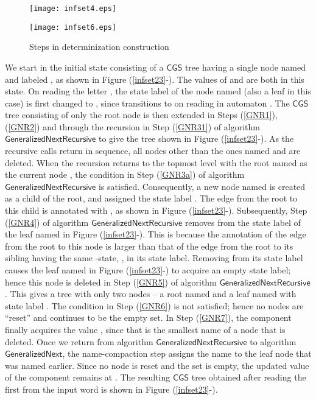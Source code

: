 \documentclass[3p]{elsarticle}
\newcommand{\CGS}{\ensuremath{\textsf{CGS }}}
\newcommand{\algo}[1]{\ensuremath{\textsf{{#1}}}}
\begin{document}
\begin{figure}[ht]
\begin{minipage}[t]{0.6\linewidth}
\vspace{0pt}
\begin{center}
\texttt{[image: infset4.eps]}
\end{center}
\label{infset4}
\end{minipage}
\begin{minipage}[t]{0.4\linewidth}
\vspace{0pt}
\begin{center}
\texttt{[image: infset6.eps]}
\end{center}
\end{minipage}
\caption{Steps in determinization construction}
\label{infset45}
\end{figure}

We start in the initial state consisting of a \CGS tree having a
single node named  and labeled , as shown in Figure
(\ref{infset23}-).  The values of  and  are both  in this state.  On reading the letter , the state label of the
node named  (also a leaf in this case) is first changed to
, since  transitions to  on reading  in
automaton .  The \CGS tree consisting of only the root node is
then extended in Steps (\ref{GNR1}), (\ref{GNR2}) and through the
recursion in Step (\ref{GNR31}) of algorithm
\algo{GeneralizedNextRecursive} to give the tree shown in Figure
(\ref{infset23}-).  As the recursive calls return in sequence,
all nodes other than the ones named  and  are deleted.  When the
recursion returns to the topmost level with the root named  as the
current node , the condition in Step (\ref{GNR3a}) of algorithm
\algo{GeneralizedNextRecursive} is satisfied.  Consequently, a new
node named  is created as a child of the root, and assigned the
state label .  The edge from the root to this child is
annotated with , as shown in Figure (\ref{infset23}-).
Subsequently, Step (\ref{GNR4}) of algorithm
\algo{GeneralizedNextRecursive} removes  from the state label of
the leaf named  in Figure (\ref{infset23}-).  This is because
the annotation of the edge from the root to this node is larger than
that of the edge from the root to its sibling having the same
-state, , in its state label.  Removing  from its state
label causes the leaf named  in Figure (\ref{infset23}-) to
acquire an empty state label; hence this node is deleted in Step
(\ref{GNR5}) of algorithm \algo{GeneralizedNextRecursive}.  This gives
a tree with only two nodes -- a root named  and a leaf named 
with state label .  The condition in Step (\ref{GNR6}) is not
satisfied; hence no nodes are ``reset'' and  continues to be the
empty set.  In Step (\ref{GNR7}), the component  finally acquires
the value , since that is the smallest name of a node that is
deleted.  Once we return from algorithm
\algo{GeneralizedNextRecursive} to algorithm \algo{GeneralizedNext},
the name-compaction step assigns the name  to the leaf node that
was named  earlier.  Since no node is reset and the set  is
empty, the updated value of the component  remains at .  The
resulting \CGS tree obtained after reading the first  from the
input word is shown in Figure (\ref{infset23}-).
\end{document}
